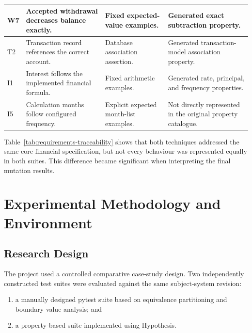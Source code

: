 \documentclass[12pt]{article}
\begin{document}
\begin{table}[H]
\begin{tabular}{
    |p{1.1cm}|
    p{4.1cm}|
    p{4.0cm}|
    p{4.0cm}|
}
W7 &
Accepted withdrawal decreases balance exactly. &
Fixed expected-value examples. &
Generated exact subtraction property. \\
\hline

T2 &
Transaction record references the correct account. &
Database association assertion. &
Generated transaction-model association property. \\
\hline

I1 &
Interest follows the implemented financial formula. &
Fixed arithmetic examples. &
Generated rate, principal, and frequency properties. \\
\hline

I5 &
Calculation months follow configured frequency. &
Explicit expected month-list examples. &
Not directly represented in the original property catalogue. \\
\hline

\end{tabular}
\end{table}

Table~\ref{tab:requirements-traceability} shows that both techniques addressed
the same core financial specification, but not every behaviour was represented
equally in both suites. This difference became significant when interpreting
the final mutation results.


\section{Experimental Methodology and Environment}

\subsection{Research Design}

The project used a controlled comparative case-study design. Two independently
constructed test suites were evaluated against the same subject-system
revision:

\begin{enumerate}
    \item a manually designed pytest suite based on equivalence partitioning
          and boundary value analysis; and
    \item a property-based suite implemented using Hypothesis.
\end{enumerate}
\end{document}
